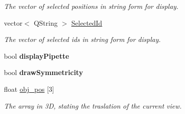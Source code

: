\begin{DoxyCompactItemize}
\begin{DoxyCompactList}\small\item\em The vector of selected positions in string form for display. \end{DoxyCompactList}\item 
\hypertarget{classGLWidget_a358fbf9622862b7fd18a5eafca90aaf2}{}vector$<$ Q\+String $>$ \hyperlink{classGLWidget_a358fbf9622862b7fd18a5eafca90aaf2}{Selected\+Id}\label{classGLWidget_a358fbf9622862b7fd18a5eafca90aaf2}

\begin{DoxyCompactList}\small\item\em The vector of selected ids in string form for display. \end{DoxyCompactList}\item 
\hypertarget{classGLWidget_a16bec7573f51d68f7606c13d258fdff2}{}bool {\bfseries display\+Pipette}\label{classGLWidget_a16bec7573f51d68f7606c13d258fdff2}

\item 
\hypertarget{classGLWidget_a50707fe8f3eb2f48a541094af67c0e2b}{}bool {\bfseries draw\+Symmetricity}\label{classGLWidget_a50707fe8f3eb2f48a541094af67c0e2b}

\item 
\hypertarget{classGLWidget_a4a046f26807fc8e3be97438d5b3cd54c}{}float \hyperlink{classGLWidget_a4a046f26807fc8e3be97438d5b3cd54c}{obj\+\_\+pos} \mbox{[}3\mbox{]}\label{classGLWidget_a4a046f26807fc8e3be97438d5b3cd54c}

\begin{DoxyCompactList}\small\item\em The array in 3\+D, stating the traslation of the current view. \end{DoxyCompactList}\end{DoxyCompactItemize}
